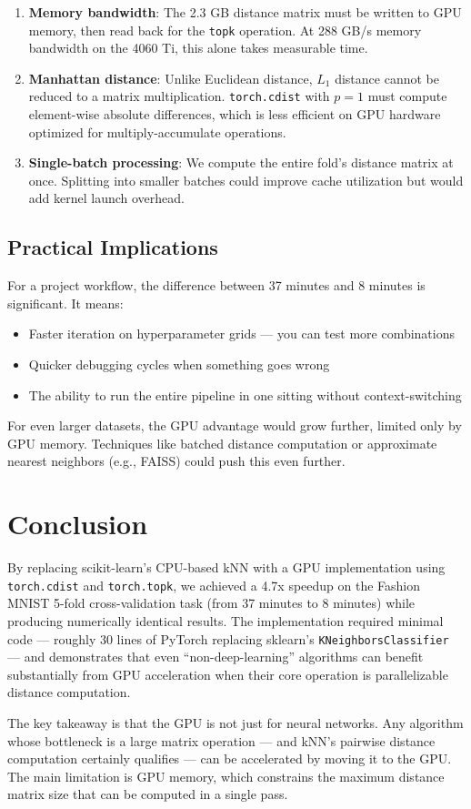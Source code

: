 \documentclass[11pt]{article}
\begin{document}
\begin{enumerate}[nosep]
	\item \textbf{Memory bandwidth}: The 2.3 GB distance matrix must be written to GPU memory, then read back for the \texttt{topk} operation. At 288 GB/s memory bandwidth on the 4060 Ti, this alone takes measurable time.
	\item \textbf{Manhattan distance}: Unlike Euclidean distance, $L_1$ distance cannot be reduced to a matrix multiplication. \texttt{torch.cdist} with $p=1$ must compute element-wise absolute differences, which is less efficient on GPU hardware optimized for multiply-accumulate operations.
	\item \textbf{Single-batch processing}: We compute the entire fold's distance matrix at once. Splitting into smaller batches could improve cache utilization but would add kernel launch overhead.
\end{enumerate}

\subsection{Practical Implications}

For a project workflow, the difference between 37 minutes and 8 minutes is significant. It means:
\begin{itemize}[nosep]
	\item Faster iteration on hyperparameter grids --- you can test more combinations
	\item Quicker debugging cycles when something goes wrong
	\item The ability to run the entire pipeline in one sitting without context-switching
\end{itemize}

For even larger datasets, the GPU advantage would grow further, limited only by GPU memory. Techniques like batched distance computation or approximate nearest neighbors (e.g., FAISS) could push this even further.

\section{Conclusion}

By replacing scikit-learn's CPU-based kNN with a GPU implementation using \texttt{torch.cdist} and \texttt{torch.topk}, we achieved a 4.7x speedup on the Fashion MNIST 5-fold cross-validation task (from 37 minutes to 8 minutes) while producing numerically identical results. The implementation required minimal code --- roughly 30 lines of PyTorch replacing sklearn's \texttt{KNeighborsClassifier} --- and demonstrates that even ``non-deep-learning'' algorithms can benefit substantially from GPU acceleration when their core operation is parallelizable distance computation.

The key takeaway is that the GPU is not just for neural networks. Any algorithm whose bottleneck is a large matrix operation --- and kNN's pairwise distance computation certainly qualifies --- can be accelerated by moving it to the GPU. The main limitation is GPU memory, which constrains the maximum distance matrix size that can be computed in a single pass.
\end{document}
